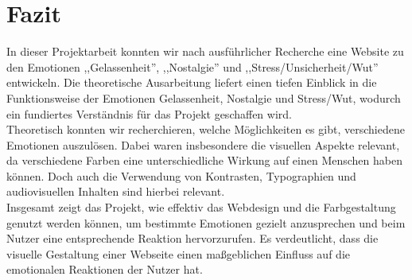 \documentclass[./dokumentation.tex]{subfiles}
\begin{document}
\chapter{Fazit}
In dieser Projektarbeit konnten wir nach ausführlicher Recherche eine Website zu den Emotionen ,,Gelassenheit'', ,,Nostalgie'' und ,,Stress/Unsicherheit/Wut'' entwickeln. Die theoretische Ausarbeitung liefert einen tiefen Einblick in die Funktionsweise der Emotionen Gelassenheit, Nostalgie und Stress/Wut, wodurch ein fundiertes Verständnis für das Projekt geschaffen wird. \\
Theoretisch konnten wir recherchieren, welche Möglichkeiten es gibt, verschiedene Emotionen auszulösen. Dabei waren insbesondere die visuellen Aspekte relevant, da verschiedene Farben eine unterschiedliche Wirkung auf einen Menschen haben können. Doch auch die Verwendung von Kontrasten, Typographien und audiovisuellen Inhalten sind hierbei relevant. \\

Insgesamt zeigt das Projekt, wie effektiv das Webdesign und die Farbgestaltung genutzt werden können, um bestimmte Emotionen gezielt anzusprechen und beim Nutzer eine entsprechende Reaktion hervorzurufen. Es verdeutlicht, dass die visuelle Gestaltung einer Webseite einen maßgeblichen Einfluss auf die emotionalen Reaktionen der Nutzer hat.
\end{document}

